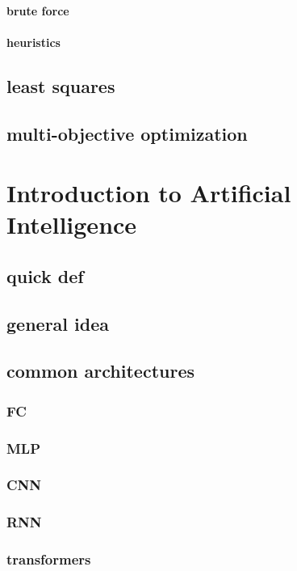 \paragraph{brute force}
\paragraph{heuristics}

\subsection{least squares}

\subsection{multi-objective optimization}

\section{Introduction to Artificial Intelligence}

\subsection{quick def}

\subsection{general idea}

\subsection{common architectures}
\subsubsection{FC}
\subsubsection{MLP}
\subsubsection{CNN}
\subsubsection{RNN}
\subsubsection{transformers}

